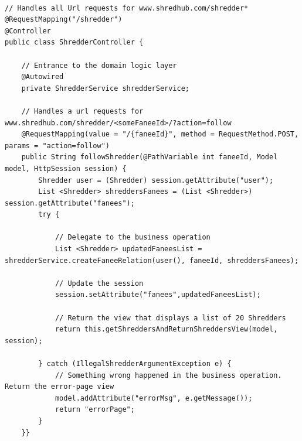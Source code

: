 \begin{lstlisting}

// Handles all Url requests for www.shredhub.com/shredder*
@RequestMapping("/shredder")
@Controller
public class ShredderController {
		
	// Entrance to the domain logic layer
	@Autowired
	private ShredderService shredderService;
			
	// Handles a url requests for www.shredhub.com/shredder/<someFaneeId>/?action=follow
	@RequestMapping(value = "/{faneeId}", method = RequestMethod.POST, params = "action=follow")
	public String followShredder(@PathVariable int faneeId, Model model, HttpSession session) {
		Shredder user = (Shredder) session.getAttribute("user");
		List <Shredder> shreddersFanees = (List <Shredder>) session.getAttribute("fanees");
		try {
			
			// Delegate to the business operation
			List <Shredder> updatedFaneesList = shredderService.createFaneeRelation(user(), faneeId, shreddersFanees);
			
			// Update the session 
			session.setAttribute("fanees",updatedFaneesList);
			
			// Return the view that displays a list of 20 Shredders
			return this.getShreddersAndReturnShreddersView(model, session);
			
		} catch (IllegalShredderArgumentException e) {
			// Something wrong happened in the business operation. Return the error-page view
			model.addAttribute("errorMsg", e.getMessage());
			return "errorPage";
		}
	}}	  
\end{lstlisting}
